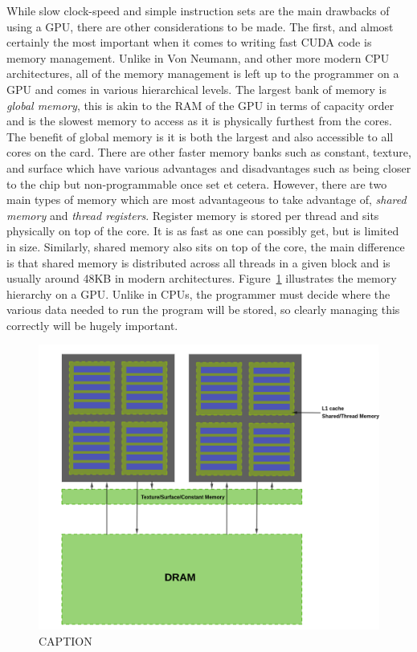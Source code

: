 While slow clock-speed and simple instruction sets are the main drawbacks of using a GPU, there are other considerations to be made. The first, and almost certainly the most important when it comes to writing fast CUDA code is memory management. Unlike in Von Neumann, and other more modern CPU architectures, all of the memory management is left up to the programmer on a GPU and comes in various hierarchical levels. The largest bank of memory is \textit{global memory}, this is akin to the RAM of the GPU in terms of capacity order and is the slowest memory to access as it is physically furthest from the cores. The benefit of global memory is it is both the largest and also accessible to all cores on the card. There are other faster memory banks such as constant, texture, and surface which have various advantages and disadvantages such as being closer to the chip but non-programmable once set et cetera. However, there are two main types of memory which are most advantageous to take advantage of, \textit{shared memory} and \textit{thread registers}. Register memory is stored per thread and sits physically on top of the core. It is as fast as one can possibly get, but is limited in size. Similarly, shared memory also sits on top of the core, the main difference is that shared memory is distributed across all threads in a given block and is usually around 48KB in modern architectures. Figure~\ref{fig:mem} illustrates the memory hierarchy on a GPU. Unlike in CPUs, the programmer must decide where the various data needed to run the program will be stored, so clearly managing this correctly will be hugely important.

\begin{figure}
	\centering
	\includegraphics[width=0.8\linewidth]{Figures/mem_arch}
	\caption{CAPTION}
	\label{fig:mem}
\end{figure}

